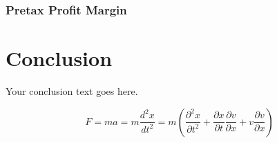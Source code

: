 \documentclass{article}
\begin{document}
\subsubsection{Pretax Profit Margin}

\section{Conclusion}

Your conclusion text goes here.


\begin{equation}
    F = ma = m\frac{d^2x}{dt^2} = m\left(\frac{\partial^2x}{\partial t^2} + \frac{\partial x}{\partial t}\frac{\partial v}{\partial x} + v\frac{\partial v}{\partial x}\right)
\end{equation}
\end{document}

